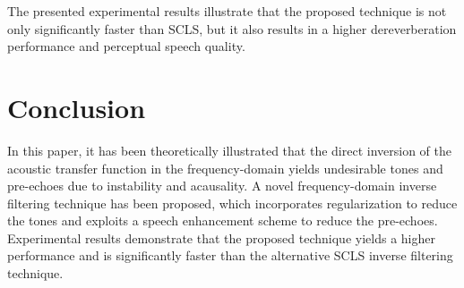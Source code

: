 \documentclass{article}
\begin{document}
The presented experimental results illustrate that the proposed technique is not only significantly faster than SCLS, but it also results in a higher dereverberation performance and perceptual speech quality.

\section{Conclusion}
In this paper, it has been theoretically illustrated that the direct inversion of the acoustic transfer function in the frequency-domain yields undesirable tones and pre-echoes due to instability and acausality.
A novel frequency-domain inverse filtering technique has been proposed, which incorporates regularization to reduce the tones and exploits a speech enhancement scheme to reduce the pre-echoes.
Experimental results demonstrate that the proposed technique yields a higher performance and is significantly faster than the alternative SCLS inverse filtering technique.



\end{document}
